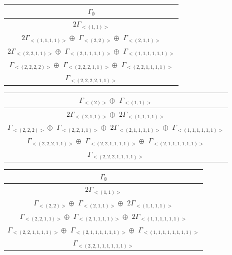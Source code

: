 \bigskip
\begin{minipage}{.45\textwidth}
\centering
\begin{tabular}{|c|}\hline
$\Gamma_\emptyset$
\\ \hline
$ 2 \Gamma_{<(
1 , 
1
)>}$
\\ \hline
$ 2 \Gamma_{<(
1 , 
1 , 
1 , 
1
)>} \oplus$
$\Gamma_{<(
2 , 
2
)>} \oplus$
$\Gamma_{<(
2 , 
1 , 
1
)>}$
\\ \hline
$ 2 \Gamma_{<(
2 , 
2 , 
1 , 
1
)>} \oplus$
$\Gamma_{<(
2 , 
1 , 
1 , 
1 , 
1
)>} \oplus$
$\Gamma_{<(
1 , 
1 , 
1 , 
1 , 
1 , 
1
)>}$
\\ \hline
$\Gamma_{<(
2 , 
2 , 
2 , 
2
)>} \oplus$
$\Gamma_{<(
2 , 
2 , 
2 , 
1 , 
1
)>} \oplus$
$\Gamma_{<(
2 , 
2 , 
1 , 
1 , 
1 , 
1
)>}$
\\ \hline
$\Gamma_{<(
2 , 
2 , 
2 , 
2 , 
1 , 
1
)>}$
\\
\hline\end{tabular}\end{minipage}
\begin{minipage}{.7\textwidth}
\centering
\begin{tabular}{|c|}\hline
$\Gamma_{<(
2
)>} \oplus$
$\Gamma_{<(
1 , 
1
)>}$
\\ \hline
$ 2 \Gamma_{<(
2 , 
1 , 
1
)>} \oplus$
$ 2 \Gamma_{<(
1 , 
1 , 
1 , 
1
)>}$
\\ \hline
$\Gamma_{<(
2 , 
2 , 
2
)>} \oplus$
$\Gamma_{<(
2 , 
2 , 
1 , 
1
)>} \oplus$
$ 2 \Gamma_{<(
2 , 
1 , 
1 , 
1 , 
1
)>} \oplus$
$\Gamma_{<(
1 , 
1 , 
1 , 
1 , 
1 , 
1
)>}$
\\ \hline
$\Gamma_{<(
2 , 
2 , 
2 , 
1 , 
1
)>} \oplus$
$\Gamma_{<(
2 , 
2 , 
1 , 
1 , 
1 , 
1
)>} \oplus$
$\Gamma_{<(
2 , 
1 , 
1 , 
1 , 
1 , 
1 , 
1
)>}$
\\ \hline
$\Gamma_{<(
2 , 
2 , 
2 , 
1 , 
1 , 
1 , 
1
)>}$
\\
\hline\end{tabular}\end{minipage}
\bigskip
\begin{minipage}{.5\textwidth}
\centering
\begin{tabular}{|c|}\hline
$\Gamma_\emptyset$
\\ \hline
$ 2 \Gamma_{<(
1 , 
1
)>}$
\\ \hline
$\Gamma_{<(
2 , 
2
)>} \oplus$
$\Gamma_{<(
2 , 
1 , 
1
)>} \oplus$
$ 2 \Gamma_{<(
1 , 
1 , 
1 , 
1
)>}$
\\ \hline
$\Gamma_{<(
2 , 
2 , 
1 , 
1
)>} \oplus$
$\Gamma_{<(
2 , 
1 , 
1 , 
1 , 
1
)>} \oplus$
$ 2 \Gamma_{<(
1 , 
1 , 
1 , 
1 , 
1 , 
1
)>}$
\\ \hline
$\Gamma_{<(
2 , 
2 , 
1 , 
1 , 
1 , 
1
)>} \oplus$
$\Gamma_{<(
2 , 
1 , 
1 , 
1 , 
1 , 
1 , 
1
)>} \oplus$
$\Gamma_{<(
1 , 
1 , 
1 , 
1 , 
1 , 
1 , 
1 , 
1
)>}$
\\ \hline
$\Gamma_{<(
2 , 
2 , 
1 , 
1 , 
1 , 
1 , 
1 , 
1
)>}$
\\
\hline\end{tabular}\end{minipage}
